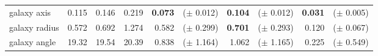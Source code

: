 \begin{tabular}{l|lll|rlrlrl}
galaxy axis       &   0.115 &   0.146 &   0.219 &  \textbf{0.073} & \hspace{-1em}($\pm$ 0.012) &   \textbf{0.104} & \hspace{-1em}($\pm$ 0.012) &   \textbf{0.031} & \hspace{-1em}($\pm$ 0.005) \\
galaxy radius     &   0.572 &   0.692 &   1.274 &  0.582 & \hspace{-1em}($\pm$ 0.299) &   \textbf{0.701} & \hspace{-1em}($\pm$ 0.293) &   0.120 & \hspace{-1em}($\pm$ 0.067) \\
galaxy angle      &  19.32 &  19.54 &  20.39 &  0.838 & \hspace{-1em}($\pm$ 1.164) &   1.062 & \hspace{-1em}($\pm$ 1.165) &   0.225 & \hspace{-1em}($\pm$ 0.549) \\
\bottomrule
\end{tabular}

